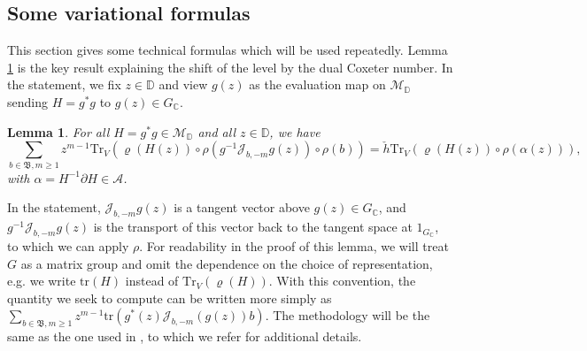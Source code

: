 \documentclass[12pt,a4paper]{amsart}
\numberwithin{equation}{section}
\newcounter{exa}
\newtheorem{lemma}[theorem]{Lemma}
\theoremstyle{remark}
\theoremstyle{definition}
\newcommand{\C}{\mathbb C}
\newcommand{\D}{\mathbb D}
\newcommand{\cA}{\mathcal A}
\newcommand{\kB}{\mathfrak B}
\newcommand{\del}{\partial}
\newcommand{\cJ}{\mathcal J}
\newcommand{\cM}{\mathcal M}
\newcommand{\tr}{\mathrm{tr}}
\begin{document}


 
    \subsection{Some variational formulas}\label{subsec:variational-formula}

This section gives some technical formulas which will be used repeatedly. Lemma \ref{lem:var1} is the key result explaining the shift of the level by the dual Coxeter number. In the statement, we fix $z\in\D$ and view $g(z)$ as the evaluation map on $\cM_\D$ sending $H=g^*g$ to $g(z)\in G_\C$.
\begin{lemma}\label{lem:var1}
For all $H=g^*g\in\cM_\D$ and all $z\in\D$, we have
    \[\sum_{b\in\kB,m\geq1}z^{m-1}\mathrm{Tr}_V\left(\varrho(H(z))\circ\rho(g^{-1}\cJ_{b,-m}g(z))\circ\rho(b)\right)=\check h\mathrm{Tr}_V\left(\varrho(H(z))\circ\rho(\alpha(z))\right),\]
    with $\alpha=H^{-1}\del H\in\cA$.
\end{lemma}
In the statement, $\cJ_{b,-m}g(z)$ is a tangent vector above $g(z)\in G_\C$, and $g^{-1}\cJ_{b,-m}g(z)$ is the transport of this vector back to the tangent space at $1_{G_\C}$, to which we can apply $\rho$. For readability in the proof of this lemma, we will treat $G$ as a matrix group and omit the dependence on the choice of representation, e.g. we write $\tr(H)$ instead of $\mathrm{Tr}_V(\varrho(H))$. With this convention, the quantity we seek to compute can be written more simply as $\sum_{b\in\kB,m\geq1}z^{m-1}\tr(g^*(z)\cJ_{b,-m}(g(z))b)$. The methodology will be the same as the one used in \cite[Section 5.1]{Bav26}, to which we refer for additional details.
\end{document}
